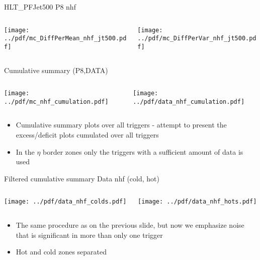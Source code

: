 \documentclass[9pt]{beamer}
\begin{document}
\begin{frame}[t]{HLT\_PFJet500 P8 nhf}
\begin{columns}[T]
  \begin{column}{.5\textwidth}
  \texttt{[image: ../pdf/mc\_DiffPerMean\_nhf\_jt500.pdf]}
  \end{column}
  \begin{column}{.5\textwidth}
  \texttt{[image: ../pdf/mc\_DiffPerVar\_nhf\_jt500.pdf]}
  \end{column}
\end{columns}
\end{frame}

\begin{frame}[t]{Cumulative summary (P8,DATA)}
\begin{columns}[T]
  \begin{column}{.5\textwidth}
  \texttt{[image: ../pdf/mc\_nhf\_cumulation.pdf]}
  \end{column}
  \begin{column}{.5\textwidth}
  \texttt{[image: ../pdf/data\_nhf\_cumulation.pdf]}
  \end{column}
\end{columns}
\begin{itemize}
 \item Cumulative summary plots over all triggers - attempt to present the excess/deficit plots cumulated over all triggers
 \item In the $\eta$ border zones only the triggers with a sufficient amount of data is used
\end{itemize}
\end{frame}

\begin{frame}[t]{Filtered cumulative summary Data nhf (cold, hot)}
\begin{columns}[T]
  \begin{column}{.5\textwidth}
  \texttt{[image: ../pdf/data\_nhf\_colds.pdf]}
  \end{column}
  \begin{column}{.5\textwidth}
  \texttt{[image: ../pdf/data\_nhf\_hots.pdf]}
  \end{column}
\end{columns}
\begin{itemize}
 \item The same procedure as on the previous slide, but now we emphasize noise that is significant in more than only one trigger
 \item Hot and cold zones separated
\end{itemize}
\end{frame}
\end{document}
